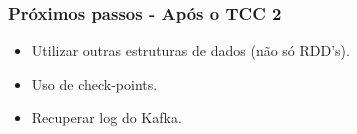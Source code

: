 \documentclass{beamer}
\begin{document}
  \begin{frame}
      \frametitle{Próximos passos - Após o TCC 2}
      \begin{itemize}
          \item Utilizar outras estruturas de dados (não só RDD's).
          \item Uso de check-points.
          \item Recuperar log do Kafka.
      \end{itemize}
  \end{frame}
\end{document}
